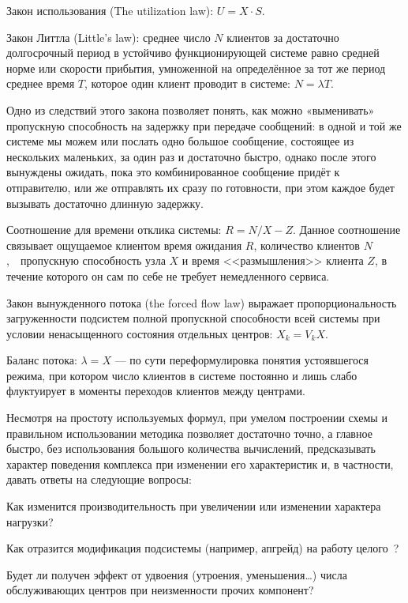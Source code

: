 \begin{itemize*}
\item Закон использования (The utilization law): $U = X \cdot S $.

\item Закон Литтла (\abbr Little's law): среднее число $N$ клиентов за достаточно долгосрочный период в устойчиво функционирующей системе  равно средней норме или скорости прибытия, умноженной на определённое за тот же период среднее время $T$, которое один клиент проводит в системе: $N = \lambda T$.

Одно из следствий этого закона позволяет понять, как можно «выменивать» пропускную способность на задержку при передаче сообщений: в одной и той же системе мы можем или послать одно большое сообщение, состоящее из нескольких маленьких, за один раз  и достаточно быстро, однако после этого вынуждены ожидать, пока это комбинированное сообщение придёт к отправителю, или же отправлять их сразу по готовности, при этом каждое будет вызывать достаточно длинную задержку.


\item Соотношение для времени отклика системы: $R = N/X - Z$. Данное соотношение связывает ощущаемое клиентом время ожидания $R$, количество клиентов $N$,~~пропускную способность узла $X$ и время <<размышления>> клиента $Z$, в течение которого он сам по себе не требует немедленного сервиса.


\item Закон вынужденного потока (\abbr the forced flow law) выражает пропорциональность загруженности подсистем полной пропускной способности всей системы при условии ненасыщенного состояния отдельных центров: $X_k = V_k X$.

\item 
Баланс потока: $\lambda = X$ --- по сути переформулировка понятия устоявшегося режима, при котором число клиентов в системе постоянно и лишь слабо флуктуирует в моменты переходов клиентов между центрами.
\end{itemize*}

Несмотря на простоту используемых формул, при умелом построении схемы и правильном использовании методика позволяет достаточно точно, а главное быстро, без использования большого количества вычислений, предсказывать характер поведения комплекса при изменении его характеристик и, в частности, давать ответы на следующие вопросы:

\begin{enumerate*}
\item Как изменится производительность при увеличении или изменении характера нагрузки?

\item Как отразится модификация подсистемы (например, апгрейд) на работу целого~\cite{tulchinski2012}?

\item Будет ли получен эффект от удвоения (утроения, уменьшения\dots) числа  обслуживающих центров при неизменности прочих компонент?
\end{enumerate*}

